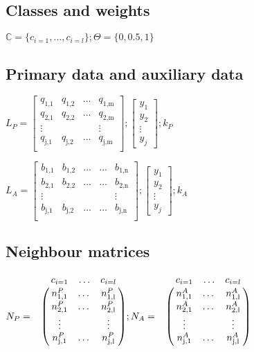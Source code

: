 \documentclass{article}
\let\bbordermatrix\bordermatrix
\begin{document}
\subsection*{Classes and weights}

$\mathbb{C} = \{c_{i=1}, \ldots, c_{i=l}\}; \Theta = \{0, 0.5, 1\}$

\subsection*{Primary data and auxiliary data}

$L_P = \begin{bmatrix}
  q_{\text{1,1}} & q_{\text{1,2}} & \ldots{} & q_{\text{1,m}} \\
  q_{\text{2,1}} & q_{\text{2,2}} & \ldots{} & q_{\text{2,m}} \\
  \vdots      &             &           & \vdots \\
  q_{\text{j,1}} & q_{\text{j,2}} & \ldots{} & q_{\text{j,m}} \\
\end{bmatrix}; 
\begin{bmatrix}
  y_1 \\
  y_2 \\
  \vdots \\
  y_j
\end{bmatrix}; 
k_P$

\noindent
$L_A = \begin{bmatrix}
  b_{\text{1,1}} & b_{\text{1,2}} & \ldots{} & \ldots{} & b_{\text{1,n}} \\
  b_{\text{2,1}} & b_{\text{2,2}} & \ldots{} & \ldots{} & b_{\text{2,n}} \\
  \vdots      &             &           &          & \vdots \\
  b_{\text{j,1}} & b_{\text{j,2}} & \ldots{} & \ldots{} & b_{\text{j,n}} \\
\end{bmatrix}; 
\begin{bmatrix}
  y_1 \\
  y_2 \\
  \vdots \\
  y_j
\end{bmatrix}; 
k_A$
\subsection*{Neighbour matrices}

$N_P = \bbordermatrix{~ & c_{i=1} & \ldots & c_{i=l} \cr
  ~ & n_{\text{1,1}}^P  & \ldots{} & n_{\text{1,l}}^P \cr
  ~ & n_{\text{2,1}}^P & \ldots{} & n_{\text{2,l}}^P \cr
  ~ & \vdots      &           & \vdots \cr
  ~ & n_{\text{j,1}}^P & \ldots{} & n_{\text{j,l}}^P \cr
}; N_A = \bbordermatrix{~ & c_{i=1} & \ldots & c_{i=l} \cr
  ~ & n_{\text{1,1}}^A  & \ldots{} & n_{\text{1,l}}^A \cr
  ~ & n_{\text{2,1}}^A & \ldots{} & n_{\text{2,l}}^A \cr
  ~ & \vdots      &           & \vdots \cr
  ~ & n_{\text{j,1}}^A & \ldots{} & n_{\text{j,l}}^A
} $
\end{document}
